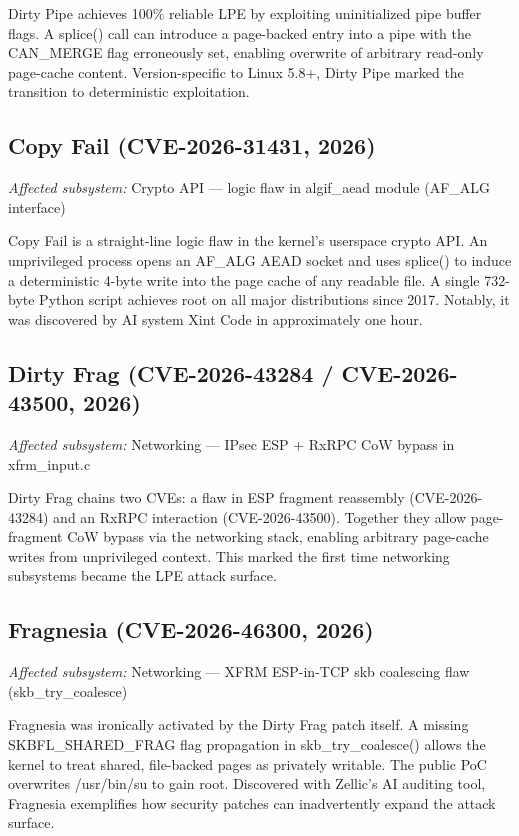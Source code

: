 \documentclass[conference]{IEEEtran}
\begin{document}
Dirty Pipe achieves 100\% reliable LPE by exploiting uninitialized pipe buffer flags. A splice() call can introduce a page-backed entry into a pipe with the CAN\_MERGE flag erroneously set, enabling overwrite of arbitrary read-only page-cache content. Version-specific to Linux 5.8+, Dirty Pipe marked the transition to deterministic exploitation.

\subsection{Copy Fail (CVE-2026-31431, 2026)}
\textit{Affected subsystem:} Crypto API --- logic flaw in algif\_aead module (AF\_ALG interface)

Copy Fail is a straight-line logic flaw in the kernel's userspace crypto API. An unprivileged process opens an AF\_ALG AEAD socket and uses splice() to induce a deterministic 4-byte write into the page cache of any readable file. A single 732-byte Python script achieves root on all major distributions since 2017. Notably, it was discovered by AI system Xint Code in approximately one hour.

\subsection{Dirty Frag (CVE-2026-43284 / CVE-2026-43500, 2026)}
\textit{Affected subsystem:} Networking --- IPsec ESP + RxRPC CoW bypass in xfrm\_input.c

Dirty Frag chains two CVEs: a flaw in ESP fragment reassembly (CVE-2026-43284) and an RxRPC interaction (CVE-2026-43500). Together they allow page-fragment CoW bypass via the networking stack, enabling arbitrary page-cache writes from unprivileged context. This marked the first time networking subsystems became the LPE attack surface.

\subsection{Fragnesia (CVE-2026-46300, 2026)}
\textit{Affected subsystem:} Networking --- XFRM ESP-in-TCP skb coalescing flaw (skb\_try\_coalesce)

Fragnesia was ironically activated by the Dirty Frag patch itself. A missing SKBFL\_SHARED\_FRAG flag propagation in skb\_try\_coalesce() allows the kernel to treat shared, file-backed pages as privately writable. The public PoC overwrites /usr/bin/su to gain root. Discovered with Zellic's AI auditing tool, Fragnesia exemplifies how security patches can inadvertently expand the attack surface.
\end{document}
